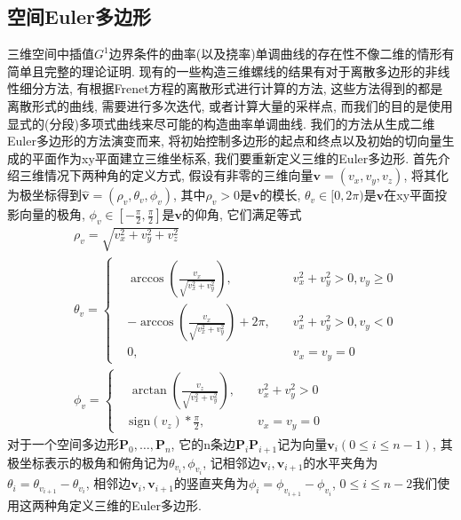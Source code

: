 \documentclass[utf8]{ctexart} %
\begin{document}
	 \subsection{空间Euler多边形}
	 三维空间中插值$G^1$边界条件的曲率(以及挠率)单调曲线的存在性不像二维的情形有简单且完整的理论证明. 现有的一些构造三维螺线的结果有对于离散多边形的非线性细分方法, 有根据Frenet方程的离散形式进行计算的方法, 这些方法得到的都是离散形式的曲线, 需要进行多次迭代, 或者计算大量的采样点, 而我们的目的是使用显式的(分段)多项式曲线来尽可能的构造曲率单调曲线. 我们的方法从生成二维Euler多边形的方法演变而来, 将初始控制多边形的起点和终点以及初始的切向量生成的平面作为xy平面建立三维坐标系, 我们要重新定义三维的Euler多边形. 首先介绍三维情况下两种角的定义方式, 假设有非零的三维向量$\boldsymbol{v}=(v_x,v_y,v_z)$, 将其化为极坐标得到$\hat{\boldsymbol{v}}=(\rho_v,\theta_v,\phi_v)$, 其中$\rho_v>0$是$\boldsymbol{v}$的模长, $\theta_v\in[0,2\pi)$是$\boldsymbol{v}$在xy平面投影向量的极角, $\phi_v\in[-\frac{\pi}2,\frac{\pi}2]$是$\boldsymbol{v}$的仰角, 它们满足等式
	 \begin{equation}\label{angle_compute}
	 \begin{aligned}
	 &\rho_v = \sqrt{v_x^2+v_y^2+v_z^2}\\
	 &\theta_v =
	 \left\{
	 \begin{aligned}
	 &\arccos(\frac{v_x}{\sqrt{v_x^2+v_y^2}}),\quad &v_x^2+v_y^2>0, v_y\geq0\\
	 &-\arccos(\frac{v_x}{\sqrt{v_x^2+v_y^2}})+2\pi, \quad &v_x^2+v_y^2>0, v_y<0\\
	 &0, \quad &v_x=v_y=0
	 \end{aligned}
	 \right.\\
	 &\phi_v = \left\{
	 \begin{aligned}
	 &\arctan(\frac{v_z}{\sqrt{v_x^2+v_y^2}}),\quad &v_x^2+v_y^2>0\\
	 &\mathrm{sign}(v_z)*\frac{\pi}2,\quad &v_x=v_y=0
	 \end{aligned}
	 \right.
	 \end{aligned}
	 \end{equation} 对于一个空间多边形$\boldsymbol{P}_0,\dots,\boldsymbol{P}_n$, 它的n条边$\boldsymbol{P}_i\boldsymbol{P}_{i+1}$记为向量$\boldsymbol{v}_i(0\leq i\leq n-1)$, 其极坐标表示的极角和俯角记为$\theta_{v_i}, \phi_{v_i}$, 记相邻边$\boldsymbol{v}_i, \boldsymbol{v}_{i+1}$的水平夹角为$\theta_i = \theta_{v_{i+1}}-\theta_{v_i}$, 相邻边$\boldsymbol{v}_i, \boldsymbol{v}_{i+1}$的竖直夹角为$\phi_i = \phi_{v_{i+1}}-\phi_{v_i}$, $0\leq i\leq n-2$我们使用这两种角定义三维的Euler多边形.
\end{document}
